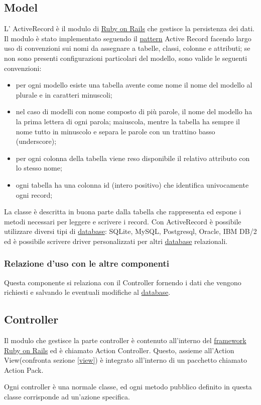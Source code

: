 \documentclass[11pt,a4paper]{article}
\begin{document}
\subsection{Model}
L' ActiveRecord è il modulo di \underline{Ruby on Rails} che gestisce la persistenza dei dati. 
Il modulo è stato implementato seguendo il \underline{pattern} Active Record facendo largo uso di convenzioni sui nomi da assegnare a tabelle, classi, colonne e attributi; se non sono presenti configurazioni particolari del modello, sono valide le seguenti convenzioni:
\begin{itemize}
 \item per ogni modello esiste una tabella avente come nome il nome del modello al plurale e in caratteri minuscoli;
\item nel caso di modelli con nome composto di più parole, il nome del modello ha la prima lettera di ogni parola; maiuscola, mentre la tabella ha sempre il nome tutto in minuscolo e separa le parole con un trattino basso (underscore);
\item per ogni colonna della tabella viene reso disponibile il relativo attributo con lo stesso nome;
\item ogni tabella ha una colonna id (intero positivo) che identifica univocamente ogni record;
\end{itemize}
La classe è descritta in buona parte dalla tabella che rappresenta ed espone i metodi necessari per leggere e scrivere i record.
Con ActiveRecord è possibile utilizzare diversi tipi di \underline{database}: SQLite, MySQL, Postgresql, Oracle, IBM DB/2 ed è possibile scrivere driver personalizzati per altri \underline{database} relazionali.
\subsubsection{Relazione d'uso con le altre componenti}
Questa componente si relaziona con il Controller fornendo i dati che vengono richiesti e salvando le eventuali modifiche al \underline{database}.
\subsection{Controller}
Il modulo che gestisce la parte controller è contenuto all'interno del \underline{framework} \underline{Ruby on Rails} ed è chiamato Action Controller.
Questo, assieme all'Action View(confronta sezione \ref{view}) è integrato all'interno di un pacchetto chiamato Action Pack.

Ogni controller è una normale classe, ed ogni metodo pubblico definito in questa classe corrisponde ad un'azione specifica.
\end{document}

